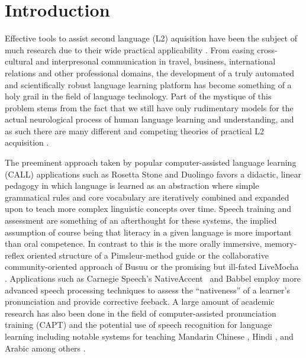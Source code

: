\section{Introduction}
Effective tools to assist second language (L2) aquisition have been the subject of much research due to their wide practical applicability \cite{higgins1983computer} \cite{levy1997computer} \cite{hubbard2008call}. From easing cross-cultural and interpresonal communication in travel, business, international relations and other professional domains, the development of a truly automated and scientifically robust language learning platform has become something of a holy grail in the field of language technology. Part of the mystique of this problem stems from the fact that we still have only rudimentary models for the actual neurological process of human language learning and understanding, and as such there are many different and competing theories of practical L2 acquisition \cite{pedersenfar} \cite{mitchell2013second}. 

The preeminent approach taken by popular computer-assisted language learning (CALL) applications such as Rosetta Stone \cite{vesselinov2009measuring} and Duolingo \cite{vesselinov2012duolingo} \cite{von2013duolingo} favors a didactic, linear pedagogy in which language is learned as an abstraction where simple grammatical rules and core vocabulary are iteratively combined and expanded upon to teach more complex linguistic concepts over time. Speech training and assessment are something of an afterthought for these systems, the implied assumption of course being that literacy in a given language is more important than oral competence. In contrast to this is the more orally immersive, memory-reflex oriented structure of a Pimsleur-method guide \cite{pimsleur2013learn} \cite{pimsleur1966testing} \cite{pimsleur1971psychology} \cite{godwin2010emerging} or the collaborative community-oriented approach of Busuu \cite{pino2011busuu} \cite{ketyi2013using} or the promising but ill-fated LiveMocha \cite{jee2009livemocha} \cite{liaw2011review}. Applications such as Carnegie Speech's NativeAccent\textregistered \ \cite{eskenazi2007nativeaccenttm} and Babbel employ more advanced speech processing techniques to assess the ``nativeness'' of a learner's pronunciation and provide corrective feeback. A large amount of academic research has also been done in the field of computer-assisted pronunciation training (CAPT) and the potential use of speech recognition for language learning \cite{franco1997automatic} \cite{minematsu2004pronunciation} \cite{van2016evaluating} \cite{mccrocklin2016pronunciation} \cite{leepersonalized} \cite{cincarek2009automatic} \cite{kim1997automatic} \cite{wolfeapplause} including notable systems for teaching Mandarin Chinese \cite{chen2004automatic} \cite{huimproved}, Hindi \cite{patil2016detection}, and Arabic \cite{maqsood2016complete} among others \cite{cucchiarini1997automatic} \cite{bernstein1990automatic}. 

